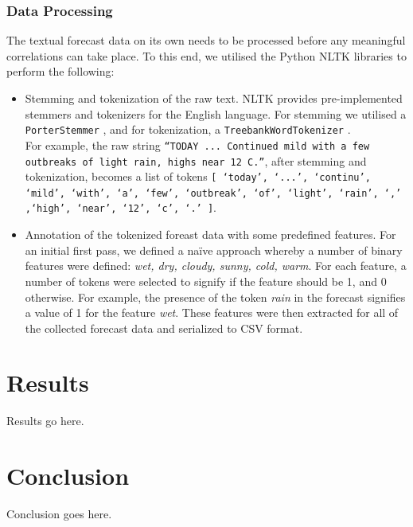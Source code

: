\documentclass[a4paper,10pt]{article}
\begin{document}
    \subsubsection{Data Processing}

    The textual forecast data on its own needs to be processed before any meaningful correlations can take place. To this end, we utilised the Python NLTK libraries to perform the following:
    \begin{itemize}
        \item{
            Stemming and tokenization of the raw text. NLTK provides pre-implemented stemmers and tokenizers for the English language. For stemming we utilised a \texttt{PorterStemmer} , and for tokenization, a \texttt{TreebankWordTokenizer} . \\
            For example, the raw string \texttt{``TODAY ... Continued mild with a few outbreaks of light rain, highs near 12 C.''}, after stemming and tokenization, becomes a list of tokens \texttt{[ `today', `...', `continu', `mild', `with', `a', `few', `outbreak', `of', `light', `rain', `,' ,`high', `near', `12', `c', `.' ]}.
        }
        \item{
            Annotation of the tokenized foreast data with some predefined features. For an initial first pass, we defined a na\"{i}ve approach whereby a number of binary features were defined: \textit{wet, dry, cloudy, sunny, cold, warm}. For each feature, a number of tokens were selected to signify if the feature should be 1, and 0 otherwise. For example, the presence of the token \textit{rain} in the forecast signifies a value of 1 for the feature \textit{wet}. These features were then extracted for all of the collected forecast data and serialized to CSV format.
        }
    \end{itemize}

    \section{Results}

    Results go here.

    \section{Conclusion}

    Conclusion goes here.
\end{document}
